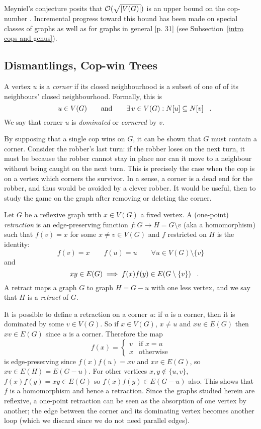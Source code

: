 Meyniel's conjecture posits that $\mathcal{O}(\sqrt{\lvert V(G)\rvert })$ is an upper bound on the cop-number \cite{frankl1987cops}.
Incremental progress toward this bound has been made on special classes of graphs as well as for graphs in general  \cite{gera2016graph}[p. 31] (see Subsection~\ref{intro cops and genus}).

\subsection{Dismantlings, Cop-win Trees \label{intro dismantlings}}

A vertex $u$ is a \textit{corner} if its closed neighbourhood
is a subset of one of of its neighbours' closed neighbourhood. Formally, this is
\[u \in V(G) \qquad \text{and} \qquad \exists \, v\in V(G) : N[u] \subseteq N[v] \mperiod \]
We say that corner $u$ is \textit{dominated} or \textit{cornered} by $v$.

By supposing that a single cop wins on $G$, it can be shown that $G$ must contain a corner. Consider the robber's last turn: if the robber loses on the next turn, it must be because the robber cannot stay in place nor can it move to a neighbour without being caught on the next turn. This is precisely the case when the cop is on a vertex which corners the survivor. In a sense, a corner is a dead end for the robber, and thus would be avoided by a clever robber. It would be useful, then to study the game on the graph after removing or deleting the corner.

Let $G$ be a reflexive graph with $x\in V(G)$ a fixed vertex. A (one-point) \textit{retraction} is an edge-preserving function $f : G \rightarrow H = G \setminus v$
(aka a homomorphism) such that $f(v) = x$ for some $x \neq v \in V(G)$ and $f$ restricted on $H$ is the identity:
\[ f(v) = x \qquad f(u) = u \qquad \forall u \in V(G)\setminus \{ v \} \]
and
\[ xy \in E(G) \implies f(x)f(y) \in E(G \setminus \{ v \}) \mperiod \]
A retract maps a graph $G$ to graph $H = G - u$ with one less vertex, and we say that $H$ is a \textit{retract} of $G$.

It is possible to define a retraction on a corner $u$: if $u$ is a corner, then it is
dominated by some $v \in V(G)$. So if $x \in V(G)$, $x \neq u$ and
$xu \in E(G)$ then $xv \in E(G)$ since $u$ is a corner. Therefore the map
\[ f(x) = \begin{cases}
v & \text{if } x = u \\
x & \text{otherwise}
\end{cases} \]
is edge-preserving since $f(x)f(u) = xv$ and $xv \in E(G)$, so $xv \in E(H) = E(G - u)$.
For other vertices $x,y \not\in \{u,v\}$, $f(x)f(y) = xy \in E(G)$ so $f(x)f(y) \in E(G- u)$ also.
This shows that $f$ is a homomorphism and hence a retraction. Since the graphs studied herein are reflexive, a one-point retraction can be seen as the absorption of one vertex by another; the edge between the corner and its dominating vertex becomes another loop (which we discard since we do not need parallel edges).

